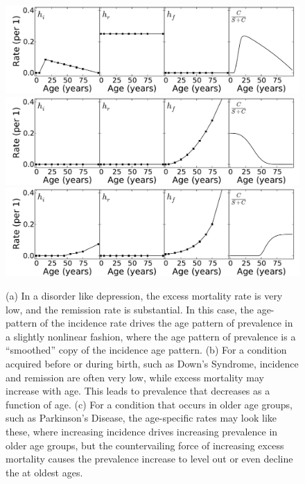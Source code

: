 \begin{figure}
\begin{center}
\includegraphics[width=\textwidth]{forward-sim-mental.pdf}
\includegraphics[width=\textwidth]{forward-sim-congenital.pdf}
\includegraphics[width=\textwidth]{forward-sim-old_age.pdf}
\caption{ (a) In a disorder like depression, the excess mortality rate is
  very low, and the remission rate is substantial.  In this case, the
  age-pattern of the incidence rate drives the age pattern of
  prevalence in a slightly nonlinear fashion, where the age pattern
  of prevalence is a ``smoothed'' copy of the incidence age pattern.
(b) For a condition acquired before or during birth, such as
  Down's Syndrome, incidence and remission are often very low, while
  excess mortality may increase with age.  This leads to prevalence
  that decreases as a function of age.
(c) For a condition that occurs in older age groups, such as
  Parkinson's Disease, the age-specific rates may look like these,
  where increasing incidence drives increasing prevalence in older age
  groups, but the countervailing force of increasing excess mortality
  causes the prevalence increase to level out or even decline the at
  oldest ages.
}
\label{forward-sim-ex3}
\end{center}
\end{figure}

